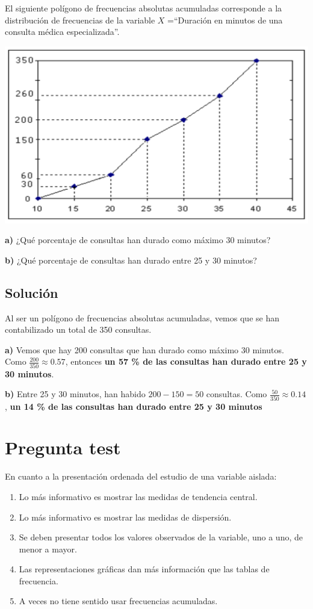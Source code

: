 \documentclass[
]{book}
\providecommand{\tightlist}{%
  \setlength{\itemsep}{0pt}\setlength{\parskip}{0pt}}
\begin{document}
El siguiente polígono de frecuencias absolutas acumuladas corresponde a la distribución de frecuencias de la variable \(X\) =``Duración en minutos de una consulta médica especializada''.

\includegraphics[width=19.47in]{img/2_1}

\textbf{a)} ¿Qué porcentaje de consultas han durado como máximo 30 minutos?

\textbf{b)} ¿Qué porcentaje de consultas han durado entre 25 y 30 minutos?

\hypertarget{soluciuxf3n-6}{%
\subsection{Solución}\label{soluciuxf3n-6}}

Al ser un polígono de frecuencias absolutas acumuladas, vemos que se han contabilizado un total de 350 consultas.

\textbf{a)} Vemos que hay 200 consultas que han durado como máximo 30 minutos. Como \(\frac{200}{350} \approx 0.57\), entonces \textbf{un 57 \% de las consultas han durado entre 25 y 30 minutos}.

\textbf{b)} Entre 25 y 30 minutos, han habido \(200 - 150 = 50\) consultas. Como \(\frac{50}{350} \approx 0.14\), \textbf{un 14 \% de las consultas han durado entre 25 y 30 minutos}

\hypertarget{pregunta-test-52}{%
\section{Pregunta test}\label{pregunta-test-52}}

En cuanto a la presentación ordenada del estudio de una variable aislada:

\begin{enumerate}
\def\labelenumi{\alph{enumi})}
\tightlist
\item
  Lo más informativo es mostrar las medidas de tendencia central.
\item
  Lo más informativo es mostrar las medidas de dispersión.
\item
  Se deben presentar todos los valores observados de la variable, uno a uno, de menor a mayor.
\item
  Las representaciones gráficas dan más información que las tablas de frecuencia.
\item
  A veces no tiene sentido usar frecuencias acumuladas.
\end{enumerate}
\end{document}
